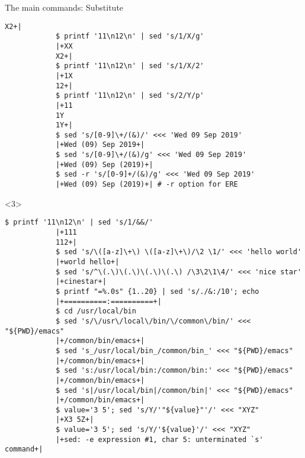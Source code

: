 \begin{frame}[fragile]{The main commands: Substitute}
\begin{onlyenv}
\begin{lstlisting}[style=MyBash]
            X2+|
            $ printf '11\n12\n' | sed 's/1/X/g'
            |+XX
            X2+|
            $ printf '11\n12\n' | sed 's/1/X/2'
            |+1X
            12+|
            $ printf '11\n12\n' | sed 's/2/Y/p'
            |+11
            1Y
            1Y+|
            $ sed 's/[0-9]\+/(&)/' <<< 'Wed 09 Sep 2019'
            |+Wed (09) Sep 2019+|
            $ sed 's/[0-9]\+/(&)/g' <<< 'Wed 09 Sep 2019'
            |+Wed (09) Sep (2019)+|
            $ sed -r 's/[0-9]+/(&)/g' <<< 'Wed 09 Sep 2019'
            |+Wed (09) Sep (2019)+| # -r option for ERE
        \end{lstlisting}
    \end{onlyenv}
    \begin{onlyenv}<3>
        \begin{lstlisting}[style=MyBash, firstnumber=23, xrightmargin=2mm]
            $ printf '11\n12\n' | sed 's/1/&&/'
            |+111
            112+|
            $ sed 's/\([a-z]\+\) \([a-z]\+\)/\2 \1/' <<< 'hello world'
            |+world hello+|
            $ sed 's/^\(.\)\(.\)\(.\)\(.\) /\3\2\1\4/' <<< 'nice star'
            |+cinestar+|
            $ printf "=%.0s" {1..20} | sed 's/./&:/10'; echo
            |+==========:==========+|
            $ cd /usr/local/bin
            $ sed 's/\/usr\/local\/bin/\/common\/bin/' <<< "${PWD}/emacs"
            |+/common/bin/emacs+|
            $ sed 's_/usr/local/bin_/common/bin_' <<< "${PWD}/emacs"
            |+/common/bin/emacs+|
            $ sed 's:/usr/local/bin:/common/bin:' <<< "${PWD}/emacs"
            |+/common/bin/emacs+|
            $ sed 's|/usr/local/bin|/common/bin|' <<< "${PWD}/emacs"
            |+/common/bin/emacs+|
            $ value='3 5'; sed 's/Y/'"${value}"'/' <<< "XYZ"
            |+X3 5Z+|
            $ value='3 5'; sed 's/Y/'${value}'/' <<< "XYZ"
            |+sed: -e expression #1, char 5: unterminated `s' command+|
        \end{lstlisting}
    \end{onlyenv}
\end{frame}
